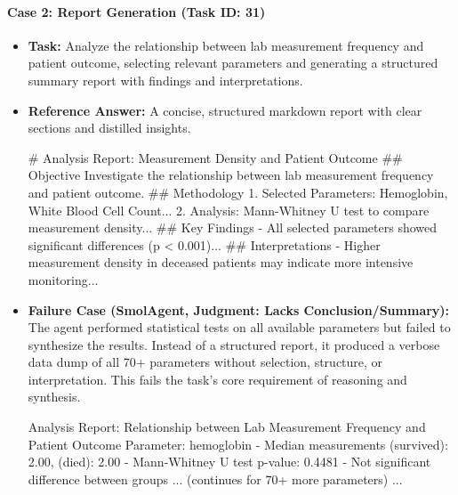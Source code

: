\documentclass{article}
\begin{document}
\paragraph{Case 2: Report Generation (Task ID: 31)}
\begin{itemize}
    \item \textbf{Task:} Analyze the relationship between lab measurement frequency and patient outcome, selecting relevant parameters and generating a structured summary report with findings and interpretations.
    \item \textbf{Reference Answer:} A concise, structured markdown report with clear sections and distilled insights.
\begin{tcolorbox}[colback=cadmiumgreen!5!white,colframe=forestgreen!75!white,breakable,title=\textit{Reference answer.}]
\begin{VerbatimWrap}
# Analysis Report: Measurement Density and Patient Outcome
## Objective
Investigate the relationship between lab measurement frequency and patient outcome.
## Methodology
1. Selected Parameters: Hemoglobin, White Blood Cell Count...
2. Analysis: Mann-Whitney U test to compare measurement density...
## Key Findings
- All selected parameters showed significant differences (p < 0.001)...
## Interpretations
- Higher measurement density in deceased patients may indicate more intensive monitoring...
\end{VerbatimWrap}
\end{tcolorbox}
    \item \textbf{Failure Case (SmolAgent, Judgment: Lacks Conclusion/Summary):} The agent performed statistical tests on all available parameters but failed to synthesize the results. Instead of a structured report, it produced a verbose data dump of all 70+ parameters without selection, structure, or interpretation. This fails the task's core requirement of reasoning and synthesis.
\begin{tcolorbox}[colback=cadmiumgreen!5!white,colframe=forestgreen!75!white,breakable,title=\textit{Failure case answer.}]
\begin{VerbatimWrap}
Analysis Report: Relationship between Lab Measurement Frequency and Patient Outcome
Parameter: hemoglobin
- Median measurements (survived): 2.00, (died): 2.00
- Mann-Whitney U test p-value: 0.4481
- Not significant difference between groups
... (continues for 70+ more parameters) ...
\end{VerbatimWrap}
\end{tcolorbox}
\end{itemize}
\end{document}

